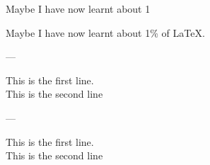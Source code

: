 \documentclass{article}
\begin{document}
  
  Maybe I have now learnt about 1%

  Maybe I have now learnt about 1\% of \LaTeX.
  
  ---


  This is the first line.\\ This is the second line

  ---


  This is the first line.\\[1cm] This is the second line
  
\end{document}
